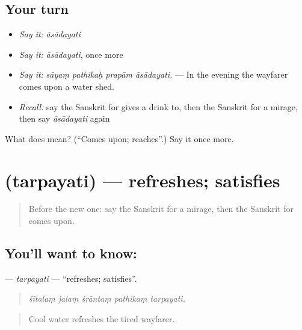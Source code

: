 \subsection*{Your turn}
\begin{itemize}
\raggedright
  \item \emph{Say it:} \emph{āsādayati}
  \item \emph{Say it:} \emph{āsādayati}, once more
  \item \emph{Say it:} \emph{sāyaṃ pathikaḥ prapām āsādayati.} — In the evening the wayfarer comes upon a water shed.
  \item \emph{Recall:} say the Sanskrit for gives a drink to, then the Sanskrit for a mirage, then say \emph{āsādayati} again
\end{itemize}

\begin{tcolorbox}[breakable,colback=teal!4,colframe=teal!35!black,title={Before you move on}]
What does  mean? (\textquotedblleft{}Comes upon; reaches\textquotedblright{}.) Say it once more.
\end{tcolorbox}
\section[\texorpdfstring{\sk{तर्पयति} (tarpayati)}{तर्पयति (tarpayati)}]{ (tarpayati) — refreshes; satisfies}

\label{lesson:SA-C420-tarpayati}



\begin{quote}
Before the new one: say the Sanskrit for a mirage, then the Sanskrit for comes upon.
\end{quote}

\subsection*{You'll want to know: }
\textbf{} — \emph{tarpayati} — \textquotedblleft{}refreshes; satisfies\textquotedblright{}.

\begin{quote}
    
\end{quote}

\begin{quote}
\emph{śītalaṃ jalaṃ śrāntaṃ pathikaṃ tarpayati.}
\end{quote}

\begin{quote}
Cool water refreshes the tired wayfarer.
\end{quote}

